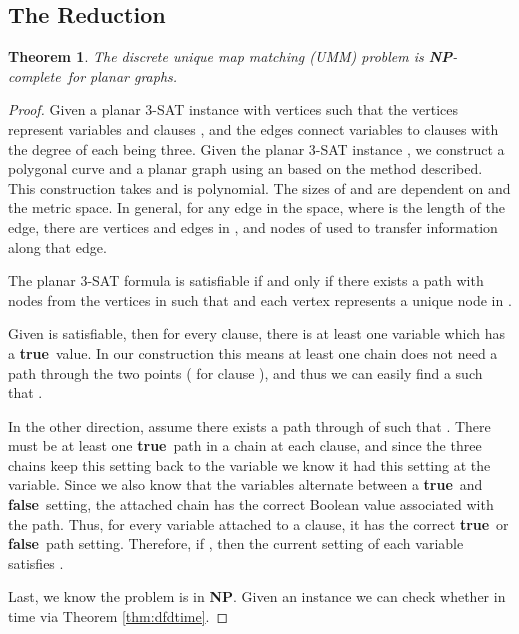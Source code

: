 \documentclass{article}[11pt]
\newcommand{\npc}{\textbf{NP}-complete}
\newcommand{\true}{\textbf{true}}
\newcommand{\false}{\textbf{false}}
\newtheorem{theorem}{Theorem}
\begin{document}
\subsection{The Reduction}

\begin{theorem} \label{thm:ummck}
    The discrete unique map matching (UMM) problem is \npc\ for planar graphs.
\end{theorem}


\begin{proof}
    Given a planar 3-SAT instance  with vertices  such that the vertices represent 
    variables  and clauses , and the edges  
    connect variables to clauses with the degree of each  being three.
    Given the planar 3-SAT instance ,  
    we construct a polygonal curve  and a planar graph  using an  based on the method described. 
    This construction takes  and is polynomial.
    The sizes of  and  are dependent on  and the metric space.  
    In general, for any edge  in the space, where  is the length of the edge, there are 
     vertices and edges in , and nodes of  used to transfer information
    along that edge.
    
    The planar 3-SAT formula  is satisfiable if and only if there exists a path  with nodes
    from the vertices in  such that  and each vertex represents a unique node in .
    
    Given  is satisfiable, then for every clause, there is at least one variable which has a \true\
    value. In our construction this means at least one chain does not need a path through the two points ( for clause ),
    and thus we can easily find a  such that .
    


    In the other direction, assume there exists a path  through  of  such that .
    There must be at least one \true\ path in a chain at each clause, and since the three chains keep this setting back to
    the variable we know it had this setting at the variable.  Since we also know that the variables
    alternate between a \true\ and \false\ setting, the attached chain has the correct Boolean value associated with the path.  
    Thus, for every variable attached to a clause, it has the correct \true\ or \false\ path setting.  
    Therefore, if , then the current setting of each variable satisfies . 
    


    Last, we know the problem is in \textbf{NP}.  Given an instance  we can check whether 
    in  time via Theorem \ref{thm:dfdtime}.
    \hfill 
\end{proof}
\end{document}
